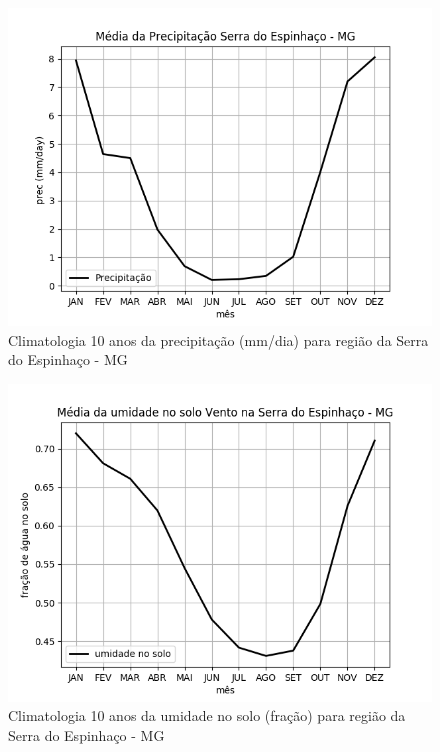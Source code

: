 \documentclass[conference]{IEEEtran}
\begin{document}
\begin{figure}[htbp]
\centerline{\includegraphics[width=0.4\paperwidth]{figuras/prec.png}}
\caption{Climatologia 10 anos da precipitação (mm/dia) para região da Serra do Espinhaço - MG}
\label{inputPrec}
\end{figure}

\begin{figure}[htbp]
\centerline{\includegraphics[width=0.4\paperwidth]{figuras/umidade.png}}
\caption{Climatologia 10 anos da umidade no solo (fração) para região da Serra do Espinhaço - MG}
\label{inputWsoi}
\end{figure}
\end{document}
